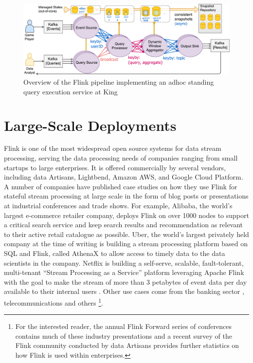 \begin{figure}[t]
\centering
\includegraphics[width=\textwidth]{figures/rbea.pdf}
\caption{Overview of the Flink pipeline implementing an adhoc standing query execution service at King} 
\label{fig:rbea}
\vspace{-4mm}
\end{figure}



\section{Large-Scale Deployments}
\label{sec:evaluation}

Flink is one of the most widespread open source systems for data stream processing, serving the data processing needs of companies ranging from small startups to large enterprises. It is offered commercially by several vendors, including data Artisans, Lightbend, Amazon AWS, and Google Cloud Platform. A number of companies have published case studies on how they use Flink for stateful stream processing at large scale in the form of blog posts or presentations at industrial conferences and trade shows. For example, {Alibaba}, the world's largest e-commerce retailer company, deploys Flink on over 1000 nodes to support a critical search service \cite{CUSTOM:web/alibaba} and keep search results and recommendation as relevant to their active retail catalogue as possible. {Uber}, the world's largest privately held company at the time of writing is building a stream processing platform based on SQL and Flink, called {AthenaX} \cite{CUSTOM:web/uber} to allow access to timely data to the data scientists in the company. {Netflix} is building a self-serve, scalable, fault-tolerant, multi-tenant “Stream Processing as a Service” platform leveraging Apache Flink with the goal to make the stream of more than 3 petabytes of event data per day available to their internal users \cite{CUSTOM:web/netflix}. Other use cases come from the banking sector \cite{CUSTOM:web/ing}, telecommunications \cite{CUSTOM:web/bouygues} and others \footnote{For the interested reader, the annual Flink Forward series of conferences contains much of these industry presentations \cite{CUSTOM:web/flinkforward} and a recent survey of the Flink community conducted by data Artisans \cite{CUSTOM:web/dartisanssurvey} provides further statistics on how Flink is used within enterprises.}. 

